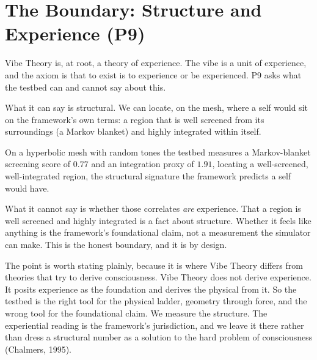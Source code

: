 \section{The Boundary: Structure and Experience (P9)}
\label{sec:mind}

Vibe Theory is, at root, a theory of experience. The vibe is a unit of experience, and the axiom is that to exist is to experience or be experienced. P9 asks what the testbed can and cannot say about this.

What it can say is structural. We can locate, on the mesh, where a self would sit on the framework's own terms: a region that is well screened from its surroundings (a Markov blanket) and highly integrated within itself.

\begin{result}
On a hyperbolic mesh with random tones the testbed measures a Markov-blanket screening score of $0.77$ and an integration proxy of $1.91$, locating a well-screened, well-integrated region, the structural signature the framework predicts a self would have.
\end{result}

What it cannot say is whether those correlates \emph{are} experience. That a region is well screened and highly integrated is a fact about structure. Whether it feels like anything is the framework's foundational claim, not a measurement the simulator can make. This is the honest boundary, and it is by design.

The point is worth stating plainly, because it is where Vibe Theory differs from theories that try to derive consciousness. Vibe Theory does not derive experience. It posits experience as the foundation and derives the physical from it. So the testbed is the right tool for the physical ladder, geometry through force, and the wrong tool for the foundational claim. We measure the structure. The experiential reading is the framework's jurisdiction, and we leave it there rather than dress a structural number as a solution to the hard problem of consciousness (Chalmers, 1995).
